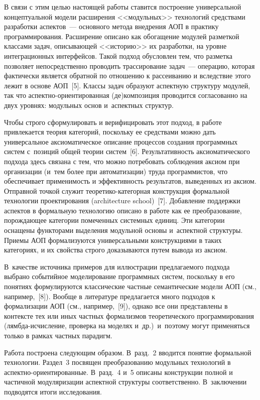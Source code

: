 \begin{multicols}{2}
 В связи с этим целью настоящей работы ставится построение универсальной
концептуальной модели расширения <<модульных>> технологий средствами
разработки аспектов~--- основного метода внедрения АОП в практику
программирования. Расширение описано как обогащение модулей разметкой
классами задач, описывающей <<историю>> их разработки, на уровне
интеграционных интерфейсов. Такой подход обусловлен тем, что разметка
позволяет непосредственно проводить трассирование задач~--- операцию,
которая фактически является обратной по отношению к рассеиванию и
вследствие этого лежит в основе АОП~[5]. Классы задач образуют аспектную
структуру модулей, так что ас\-пект\-но-ори\-ен\-ти\-ро\-ван\-ная
(де)композиция проводится согласованно на двух уровнях: модульных основ
и~аспектных структур.

 Чтобы строго сформулировать и верифицировать этот подход, в работе
привлекается теория категорий, поскольку ее средствами можно дать
универсальное аксиоматическое описание процессов создания программных
систем с~позиций общей теории систем~[6]. Результативность
аксиоматического подхода здесь связана с тем, что можно потребовать
соблюдения аксиом при организации (и~тем более при автоматизации) труда
программистов, что обеспечивает применимость и эффективность результатов,
выведенных из аксиом. Отправной точкой служит теоретико-категорная
конструкция формальной технологии проектирования (architecture school)~[7].
Добавление поддержки аспектов в формальную технологию описано в работе
как ее преобразование, порождающее категории помеченных системных
единиц. Эти категории оснащены функторами выделения модульной основы
и~аспектной структуры. Приемы АОП формализуются универсальными
конструкциями в таких категориях, и их свойства строго доказываются путем
вывода из аксиом.

В~качестве источника примеров для иллюстрации
предлагаемого подхода выбрано событийное моделирование программных
систем, поскольку в его понятиях формулируются классические частные
семантические модели АОП (см., например,~[8]). Вообще в литературе
предлагается много подходов к формализации АОП (см., например,~[9]),
однако все они представлены в контексте тех или иных частных формализмов
теоретического программирования (лямб\-да-ис\-чис\-ле\-ние, проверка на
моделях и~др.)\ и~поэтому могут применяться только в рамках частных
парадигм.

 Работа построена следующим образом. В~разд.~2 вводится понятие
формальной технологии. Раздел~3 посвящен преобразованию модульных
технологий в аспект\-но-ори\-ен\-ти\-ро\-ван\-ные. В~разд.~4 и~5 описаны
конструкции полной и частичной модуляризации аспектной структуры
соответственно. В~заключении подводятся итоги исследования.


\end{multicols}
